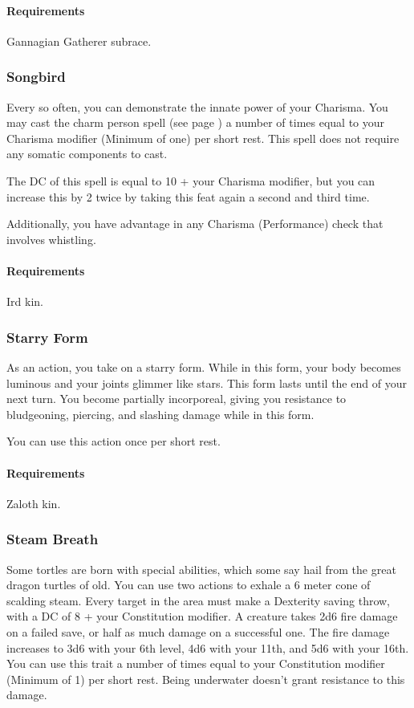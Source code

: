    \paragraph{Requirements} Gannagian Gatherer subrace.
\subsubsection{Songbird} \label{feat::songbird}
    Every so often, you can demonstrate the innate power of your Charisma.
    You may cast the charm person spell (see page \pageref{spell::charmperson}) a number of times equal to your Charisma modifier (Minimum of one) per short rest.
    This spell does not require any somatic components to cast.

    The DC of this spell is equal to 10 + your Charisma modifier, but you can increase this by 2 twice by taking this feat again a second and third time.

    Additionally, you have advantage in any Charisma (Performance) check that involves whistling.
    \paragraph{Requirements} Ird kin.
\subsubsection{Starry Form} \label{feat::starryform}
    As an action, you take on a starry form.
    While in this form, your body becomes luminous and your joints glimmer like stars.
    This form lasts until the end of your next turn.
    You become partially incorporeal, giving you resistance to bludgeoning, piercing, and slashing damage while in this form.

    You can use this action once per short rest.
    \paragraph{Requirements} Zaloth kin.
\subsubsection{Steam Breath} \label{feat::steambreath}
    Some tortles are born with special abilities, which some say hail from the great dragon turtles of old.
    You can use two actions to exhale a 6 meter cone of scalding steam.
    Every target in the area must make a Dexterity saving throw, with a DC of 8 + your Constitution modifier.
    A creature takes 2d6 fire damage on a failed save, or half as much damage on a successful one.
    The fire damage increases to 3d6 with your 6th level, 4d6 with your 11th, and 5d6 with your 16th.
    You can use this trait a number of times equal to your Constitution modifier (Minimum of 1) per short rest.
    Being underwater doesn't grant resistance to this damage.

